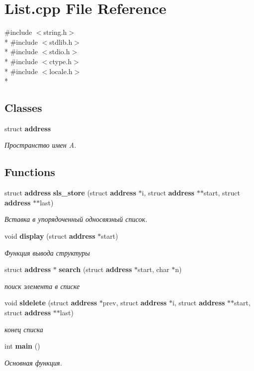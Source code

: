 \section{List.\-cpp File Reference}
\label{_list_8cpp}
{\ttfamily \#include $<$string.\-h$>$}\\*
{\ttfamily \#include $<$stdlib.\-h$>$}\\*
{\ttfamily \#include $<$stdio.\-h$>$}\\*
{\ttfamily \#include $<$ctype.\-h$>$}\\*
{\ttfamily \#include $<$locale.\-h$>$}\\*
\subsection*{Classes}
\begin{DoxyCompactItemize}
\item 
struct {\bf address}
\begin{DoxyCompactList}\small\item\em Пространство имен A. \end{DoxyCompactList}\end{DoxyCompactItemize}
\subsection*{Functions}
\begin{DoxyCompactItemize}
\item 
struct {\bf address} {\bf sls\-\_\-store} (struct {\bf address} $\ast$i, struct {\bf address} $\ast$$\ast$start, struct {\bf address} $\ast$$\ast$last)
\begin{DoxyCompactList}\small\item\em Вставка в упорядоченный односвязный список. \end{DoxyCompactList}\item 
void {\bf display} (struct {\bf address} $\ast$start)\label{_list_8cpp_aa40ba7a82e24b4eaa349288b6a2f2f48}

\begin{DoxyCompactList}\small\item\em Функция вывода структуры \end{DoxyCompactList}\item 
struct {\bf address} $\ast$ {\bf search} (struct {\bf address} $\ast$start, char $\ast$n)
\begin{DoxyCompactList}\small\item\em поиск элемента в списке \end{DoxyCompactList}\item 
void {\bf sldelete} (struct {\bf address} $\ast$prev, struct {\bf address} $\ast$i, struct {\bf address} $\ast$$\ast$start, struct {\bf address} $\ast$$\ast$last)
\begin{DoxyCompactList}\small\item\em конец списка \end{DoxyCompactList}\item 
int {\bf main} ()
\begin{DoxyCompactList}\small\item\em Основная функция. \end{DoxyCompactList}\end{DoxyCompactItemize}
